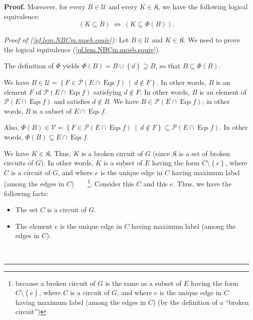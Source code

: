 \documentclass[numbers=enddot,12pt,final,onecolumn,notitlepage]{scrartcl}%
\theoremstyle{definition}
\newenvironment{proof}[1][Proof]{\noindent\textbf{#1.} }{\ \rule{0.5em}{0.5em}}
\newenvironment{verlong}{}{}
\begin{document}
\begin{verlong}
\begin{proof}
Moreover, for every $B\in\mathcal{U}$ and every $K\in\mathfrak{K}$, we have
the following logical equivalence:%
\begin{equation}
\left(  K\subseteq B\right)  \ \Longleftrightarrow\ \left(  K\subseteq
\Phi\left(  B\right)  \right)  . \label{pf.lem.NBCm.moeb.equiv}%
\end{equation}


\textit{Proof of (\ref{pf.lem.NBCm.moeb.equiv}):} Let $B\in\mathcal{U}$ and
$K\in\mathfrak{K}$. We need to prove the logical equivalence
(\ref{pf.lem.NBCm.moeb.equiv}).

The definition of $\Phi$ yields $\Phi\left(  B\right)  =B\cup\left\{
d\right\}  \supseteq B$, so that $B\subseteq\Phi\left(  B\right)  $.

We have $B\in\mathcal{U}=\left\{  F\in\mathcal{P}\left(  E\cap
\operatorname*{Eqs}f\right)  \ \mid\ d\notin F\right\}  $. In other words, $B$
is an element $F$ of $\mathcal{P}\left(  E\cap\operatorname*{Eqs}f\right)  $
satisfying $d\notin F$. In other words, $B$ is an element of $\mathcal{P}%
\left(  E\cap\operatorname*{Eqs}f\right)  $ and satisfies $d\notin B$. We have
$B\in\mathcal{P}\left(  E\cap\operatorname*{Eqs}f\right)  $; in other words,
$B$ is a subset of $E\cap\operatorname*{Eqs}f$.

Also, $\Phi\left(  B\right)  \in\mathcal{V}=\left\{  F\in\mathcal{P}\left(
E\cap\operatorname*{Eqs}f\right)  \ \mid\ d\notin F\right\}  \subseteq
\mathcal{P}\left(  E\cap\operatorname*{Eqs}f\right)  $. In other words,
$\Phi\left(  B\right)  \subseteq E\cap\operatorname*{Eqs}f$.

We have $K\in\mathfrak{K}$. Thus, $K$ is a broken circuit of $G$ (since
$\mathfrak{K}$ is a set of broken circuits of $G$). In other words, $K$ is a
subset of $E$ having the form $C\setminus\left\{  e\right\}  $, where $C$ is a
circuit of $G$, and where $e$ is the unique edge in $C$ having maximum label
(among the edges in $C$)\ \ \ \ \footnote{because a broken circuit of $G$ is
the same as a subset of $E$ having the form $C\setminus\left\{  e\right\}  $,
where $C$ is a circuit of $G$, and where $e$ is the unique edge in $C$ having
maximum label (among the edges in $C$) (by the definition of a
\textquotedblleft broken circuit\textquotedblright)}. Consider this $C$ and
this $e$. Thus, we have the following facts:

\begin{itemize}
\item The set $C$ is a circuit of $G$.

\item The element $e$ is the unique edge in $C$ having maximum label (among
the edges in $C$).


\end{itemize}
\end{proof}
\end{verlong}
\end{document}
